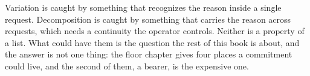 Variation is caught by something that recognizes the reason inside a
single request. Decomposition is caught by something that carries the
reason across requests, which needs a continuity the operator controls.
Neither is a property of a list. What could have them is the question
the rest of this book is about, and the answer is not one thing: the
floor chapter gives four places a commitment could live, and the second of them, a bearer, is the expensive one.